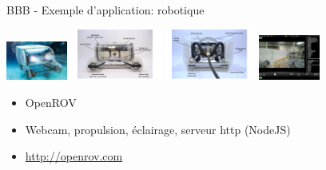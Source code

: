 \documentclass{beamer}
\begin{document}
\begin{frame}{BBB - Exemple d'application: robotique}

  \begin{center}
    \includegraphics[width=20mm]{./pic/openrov_outside.jpg}
    \hspace{0.500mm}
    \includegraphics[width=30mm]{./pic/openrov_front.jpg}
    \hspace{0.500mm}
    \includegraphics[width=30mm]{./pic/openrov_back.jpg}
    \hspace{0.500mm}
    \includegraphics[width=20mm]{./pic/openrov_cockpit.png}
  \end{center}

  \begin{small}
    \begin{itemize}
    \item OpenROV
    \item Webcam, propulsion, \'{e}clairage, serveur http (NodeJS)
    \item \url{http://openrov.com}
    \end{itemize}
  \end{small}

\end{frame}
\end{document}
